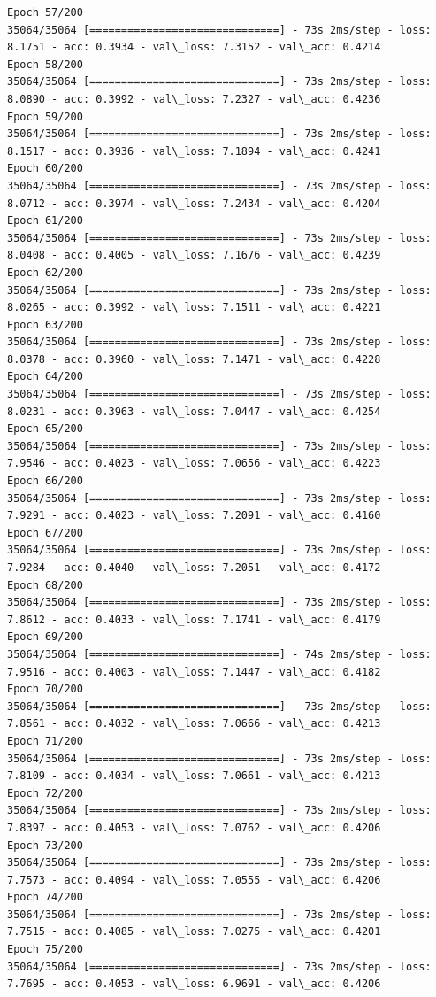 \documentclass[11pt]{article}
\begin{document}
\begin{Verbatim}[commandchars=\\\{\}]
Epoch 57/200
35064/35064 [==============================] - 73s 2ms/step - loss: 8.1751 - acc: 0.3934 - val\_loss: 7.3152 - val\_acc: 0.4214
Epoch 58/200
35064/35064 [==============================] - 73s 2ms/step - loss: 8.0890 - acc: 0.3992 - val\_loss: 7.2327 - val\_acc: 0.4236
Epoch 59/200
35064/35064 [==============================] - 73s 2ms/step - loss: 8.1517 - acc: 0.3936 - val\_loss: 7.1894 - val\_acc: 0.4241
Epoch 60/200
35064/35064 [==============================] - 73s 2ms/step - loss: 8.0712 - acc: 0.3974 - val\_loss: 7.2434 - val\_acc: 0.4204
Epoch 61/200
35064/35064 [==============================] - 73s 2ms/step - loss: 8.0408 - acc: 0.4005 - val\_loss: 7.1676 - val\_acc: 0.4239
Epoch 62/200
35064/35064 [==============================] - 73s 2ms/step - loss: 8.0265 - acc: 0.3992 - val\_loss: 7.1511 - val\_acc: 0.4221
Epoch 63/200
35064/35064 [==============================] - 73s 2ms/step - loss: 8.0378 - acc: 0.3960 - val\_loss: 7.1471 - val\_acc: 0.4228
Epoch 64/200
35064/35064 [==============================] - 73s 2ms/step - loss: 8.0231 - acc: 0.3963 - val\_loss: 7.0447 - val\_acc: 0.4254
Epoch 65/200
35064/35064 [==============================] - 73s 2ms/step - loss: 7.9546 - acc: 0.4023 - val\_loss: 7.0656 - val\_acc: 0.4223
Epoch 66/200
35064/35064 [==============================] - 73s 2ms/step - loss: 7.9291 - acc: 0.4023 - val\_loss: 7.2091 - val\_acc: 0.4160
Epoch 67/200
35064/35064 [==============================] - 73s 2ms/step - loss: 7.9284 - acc: 0.4040 - val\_loss: 7.2051 - val\_acc: 0.4172
Epoch 68/200
35064/35064 [==============================] - 73s 2ms/step - loss: 7.8612 - acc: 0.4033 - val\_loss: 7.1741 - val\_acc: 0.4179
Epoch 69/200
35064/35064 [==============================] - 74s 2ms/step - loss: 7.9516 - acc: 0.4003 - val\_loss: 7.1447 - val\_acc: 0.4182
Epoch 70/200
35064/35064 [==============================] - 73s 2ms/step - loss: 7.8561 - acc: 0.4032 - val\_loss: 7.0666 - val\_acc: 0.4213
Epoch 71/200
35064/35064 [==============================] - 73s 2ms/step - loss: 7.8109 - acc: 0.4034 - val\_loss: 7.0661 - val\_acc: 0.4213
Epoch 72/200
35064/35064 [==============================] - 73s 2ms/step - loss: 7.8397 - acc: 0.4053 - val\_loss: 7.0762 - val\_acc: 0.4206
Epoch 73/200
35064/35064 [==============================] - 73s 2ms/step - loss: 7.7573 - acc: 0.4094 - val\_loss: 7.0555 - val\_acc: 0.4206
Epoch 74/200
35064/35064 [==============================] - 73s 2ms/step - loss: 7.7515 - acc: 0.4085 - val\_loss: 7.0275 - val\_acc: 0.4201
Epoch 75/200
35064/35064 [==============================] - 73s 2ms/step - loss: 7.7695 - acc: 0.4053 - val\_loss: 6.9691 - val\_acc: 0.4206

\end{Verbatim}
\end{document}
